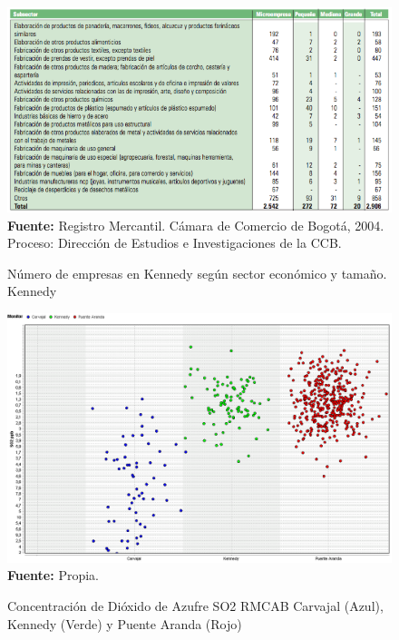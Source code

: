 \documentclass[a4paper,openright,12pt]{book}
\theoremstyle{definition}
\theoremstyle{remark}
\begin{document}
\begin{figure}[!ht]
\centering
\caption{Número de empresas en Kennedy según sector económico y tamaño. Kennedy}
 \includegraphics[scale=0.6]{Kennedy}
\label{fig:1_OpenSSL}
\\ \textbf{Fuente:} Registro Mercantil. Cámara de Comercio de Bogotá, 2004. Proceso: Dirección de Estudios e Investigaciones de la CCB.
\end{figure}
 
\begin{figure}[ht]
\centering
\caption{Concentración de Dióxido de Azufre SO2 RMCAB Carvajal (Azul), Kennedy (Verde) y Puente Aranda (Rojo)}
 \includegraphics[scale=0.45]{RMCABanalisis/AnalisisRMCABSO2}
\label{fig:1_OpenSSL}
\\ \textbf{Fuente:} Propia.
\end{figure}
\end{document}
